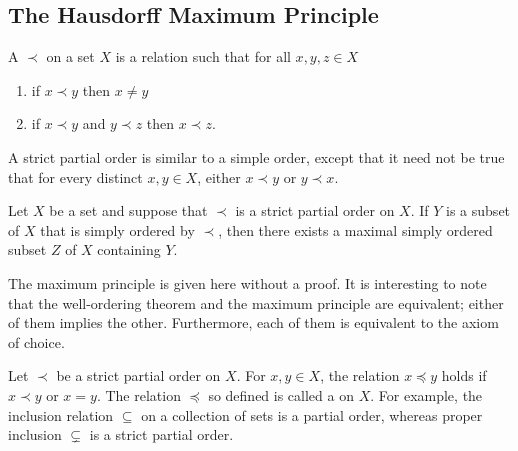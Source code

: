 \subsection{The Hausdorff Maximum Principle}
\label{app:maximum-principle}

A  $\prec$ on a set $X$ is a relation such that for all $x, y, z \in X$
\begin{enumerate}
\item if $x \prec y$ then $x \neq y$
\item if $x \prec y$ and $y \prec z$ then $x \prec z$.
\end{enumerate}

A strict partial order is similar to a simple order, except that it need not be true that for every distinct $x, y \in X$, either $x \prec y$ or $y \prec x$.

\begin{fact}
Let $X$ be a set and suppose that $\prec$ is a strict partial order on $X$.
If $Y$ is a subset of $X$ that is simply ordered by $\prec$, then there exists a maximal simply ordered subset $Z$ of $X$ containing $Y$.
\end{fact}

The maximum principle is given here without a proof.
It is interesting to note that the well-ordering theorem and the maximum principle are equivalent; either of them implies the other.
Furthermore, each of them is equivalent to the axiom of choice.

Let $\prec$ be a strict partial order on $X$.
For $x, y \in X$, the relation $x \preceq y$ holds if $x \prec y$ or $x = y$.
The relation $\preceq$ so defined is called a  on $X$.
For example, the inclusion relation $\subseteq$ on a collection of sets is a partial order, whereas proper inclusion $\subsetneq$ is a strict partial order.
